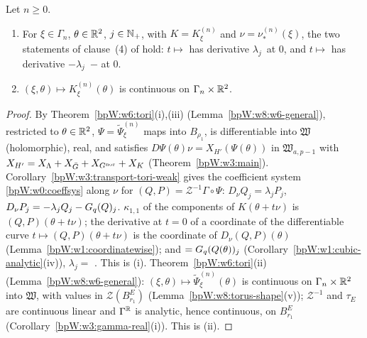 \begin{lemma}\label{bpW:w8:shell-inv}
Let $n\ge0$.
\begin{enumerate}[label=(\roman*)]
\item For $\xi\in\Gamma_n$, $\theta\in\mathbb{R}^2$, $j\in\mathbb{N}_+$, with $K=K^{(n)}_\xi$ and $\nu=\nu^{(n)}_*(\xi)$, the two 
  statements of clause~(4) of  hold: $t\mapsto$  has derivative
  $\lambda_j\,$ at $0$, and $t\mapsto$  has derivative
  $-\lambda_j\,$ $-$  at $0$.
\item $(\xi,\theta)\mapsto K^{(n)}_\xi(\theta)$ is continuous on $\Gamma_n\times\mathbb{R}^2$.
\end{enumerate}
\end{lemma}
\begin{proof}
\label{stepW:w8:si-weak} By Theorem~\ref{bpW:w6:tori}(i),(iii) (Lemma~\ref{bpW:w8:w6-general}), restricted to $\theta\in\mathbb{R}^2$,
$\Psi=\tilde\Psi^{(n)}_\xi$ maps into $B_{\rho_1}$, is differentiable into $\mathfrak W$ (holomorphic), real, and satisfies
$D\Psi(\theta)\nu=X_{H'}(\Psi(\theta))$ in $\mathfrak W_{a,p-1}$ with $X_{H'}=X_\Lambda+X_{\bar G}+X_{G^{\rm nor}}+X_K$
(Theorem~\ref{bpW:w3:main}).
\label{stepW:w8:si-tr} Corollary~\ref{bpW:w3:transport-tori-weak} gives the coefficient system \eqref{bpW:w0:coeffsys} along $\nu$ for
$(Q,P)=\mathcal Z^{-1}\Gamma\circ\Psi$: $D_\nu Q_j=\lambda_jP_j$, $D_\nu P_j=-\lambda_jQ_j-G_q(Q)_j$.
\label{stepW:w8:si-frozen} $\kappa_{1,1}$ of the components of $K(\theta+t\nu)$ is $(Q,P)(\theta+t\nu)$; the derivative at $t=0$
of a coordinate of the differentiable curve $t\mapsto(Q,P)(\theta+t\nu)$ is the coordinate of $D_\nu(Q,P)(\theta)$
(Lemma~\ref{bpW:w1:coordinatewise}); and  $=G_q(Q(\theta))_j$ (Corollary~\ref{bpW:w1:cubic-analytic}(iv)),
$\lambda_j=$ . This is (i).
\label{stepW:w8:si-cont} Theorem~\ref{bpW:w6:tori}(ii) (Lemma~\ref{bpW:w8:w6-general}): $(\xi,\theta)\mapsto\tilde\Psi^{(n)}_\xi(\theta)$ is
continuous on $\Gamma_n\times\mathbb{R}^2$ into $\mathfrak W$, with values in $\mathcal Z(B^E_{r_1})$ (Lemma~\ref{bpW:w8:torus-shape}(v)); $\mathcal Z^{-1}$ and
$\tau_E$ are continuous linear and $\Gamma^{\mathbb{R}}$ is analytic, hence continuous, on $B^E_{r_1}$ (Corollary~\ref{bpW:w3:gamma-real}(i)). This is (ii).
\end{proof}

